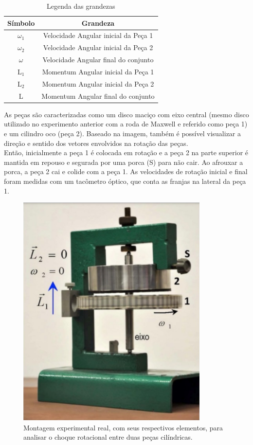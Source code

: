 \begin{table}[H]
    \centering
    \begin{tabular}{ |c||c| }
        \hline
        \textbf{Símbolo} & \textbf{Grandeza}\\
        \hline
        $\omega _1$     & Velocidade Angular inicial da Peça 1\\
        $\omega _2$     & Velocidade Angular inicial da Peça 2\\
        $\omega $       & Velocidade Angular final do conjunto\\
        \hline
        L$_1$   & Momentum Angular inicial da Peça 1\\
        L$_2$   & Momentum Angular inicial da Peça 2\\
        L       & Momentum Angular final do conjunto\\
        \hline
    \end{tabular}
    \caption{Legenda das grandezas}
\end{table}

As peças são caracterizadas como um disco maciço com eixo central (mesmo disco utilizado no experimento anterior com a roda de Maxwell e referido como peça 1) e um cilindro oco (peça 2). Baseado na imagem, também é possível visualizar a direção e sentido dos vetores envolvidos na rotação das peças.\\

Então, inicialmente a peça 1 é colocada em rotação e a peça 2 na parte superior é mantida em repouso e segurada por uma porca (S) para não cair. Ao afrouxar a porca, a peça 2 cai e colide com a peça 1. As velocidades de rotação inicial e final foram medidas com um tacômetro óptico, que conta as franjas na lateral da peça 1.

\begin{figure}[H]
  \centering
  \includegraphics[scale=0.8]{images/experimento_choque.png}
  \caption{Montagem experimental real, com seus respectivos elementos, para analisar o choque rotacional entre duas peças cilíndricas.}
\end{figure}

